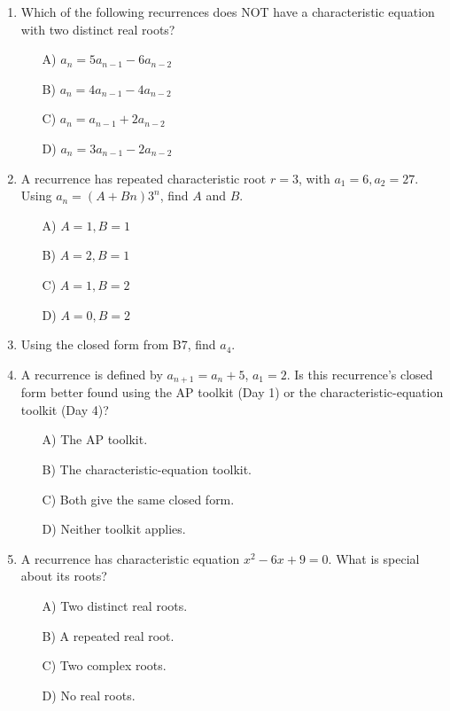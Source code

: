 \documentclass[11pt,a4paper]{article}
\begin{document}
\begin{enumerate}
\item Which of the following recurrences does NOT have a characteristic equation with two distinct real roots?
\begin{itemize}
\item[A)] $a_n=5a_{n-1}-6a_{n-2}$
\item[B)] $a_n=4a_{n-1}-4a_{n-2}$
\item[C)] $a_n=a_{n-1}+2a_{n-2}$
\item[D)] $a_n=3a_{n-1}-2a_{n-2}$
\end{itemize}

\item A recurrence has repeated characteristic root $r=3$, with $a_1=6,a_2=27$. Using $a_n=(A+Bn)3^n$, find $A$ and $B$.
\begin{itemize}
\item[A)] $A=1,B=1$
\item[B)] $A=2,B=1$
\item[C)] $A=1,B=2$
\item[D)] $A=0,B=2$
\end{itemize}

\item Using the closed form from B7, find $a_4$.

\item A recurrence is defined by $a_{n+1}=a_n+5$, $a_1=2$. Is this recurrence's closed form better found using the AP toolkit (Day 1) or the characteristic-equation toolkit (Day 4)?
\begin{itemize}
\item[A)] The AP toolkit.
\item[B)] The characteristic-equation toolkit.
\item[C)] Both give the same closed form.
\item[D)] Neither toolkit applies.
\end{itemize}

\item A recurrence has characteristic equation $x^2-6x+9=0$. What is special about its roots?
\begin{itemize}
\item[A)] Two distinct real roots.
\item[B)] A repeated real root.
\item[C)] Two complex roots.
\item[D)] No real roots.
\end{itemize}

\end{enumerate}
\end{document}

